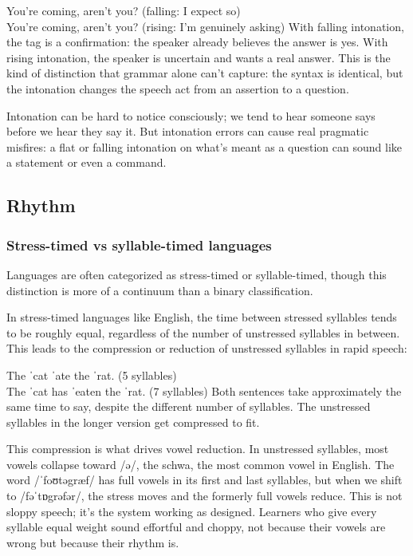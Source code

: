 \ea You're coming, aren't you? \hfill(falling: I expect so)\\
You're coming, aren't you? \hfill(rising: I'm genuinely asking)
\z
With falling intonation, the tag is a confirmation: the speaker already believes the answer is yes. With rising intonation, the speaker is uncertain and wants a real answer. This is the kind of distinction that grammar alone can't capture: the syntax is identical, but the intonation changes the speech act from an assertion to a question.

Intonation can be hard to notice consciously; we tend to hear  someone says before we hear  they say it. But intonation errors can cause real pragmatic misfires: a flat or falling intonation on what's meant as a question can sound like a statement or even a command.

\subsection{Rhythm}

\subsubsection{Stress-timed vs syllable-timed languages}

Languages are often categorized as stress-timed or syllable-timed, though this distinction is more of a continuum than a binary classification.

In stress-timed languages like English, the time between stressed syllables tends to be roughly equal, regardless of the number of unstressed syllables in between. This leads to the compression or reduction of unstressed syllables in rapid speech:

\ea
The ˈcat \phantom{has} ˈate\phantom{en} the ˈrat. \hfill(5 syllables)\\
The ˈcat has ˈeaten the ˈrat. \hfill(7 syllables)
\z
Both sentences take approximately the same time to say, despite the different number of syllables. The unstressed syllables in the longer version get compressed to fit.

This compression is what drives vowel reduction. In unstressed syllables, most vowels collapse toward /ə/, the schwa, the most common vowel in English. The word  /ˈfoʊtəgræf/ has full vowels in its first and last syllables, but when we shift to  /fəˈtɒgrəfər/, the stress moves and the formerly full vowels reduce. This is not sloppy speech; it's the system working as designed. Learners who give every syllable equal weight sound effortful and choppy, not because their vowels are wrong but because their rhythm is.

